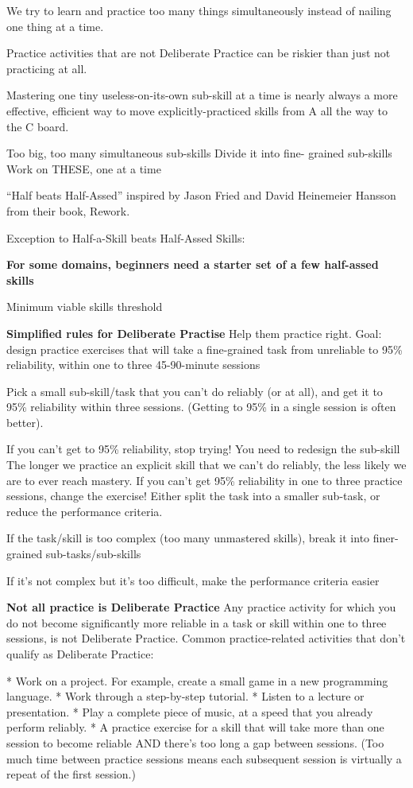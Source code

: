 We try to learn and practice too many things simultaneously instead of nailing one thing at a time.

Practice activities that are not Deliberate Practice can be riskier
than just not practicing at all.

Mastering one tiny useless-on-its-own sub-skill at a time
is nearly always a more effective, efficient way to move explicitly-practiced skills from A all the way to the C board.

Too big, too many simultaneous sub-skills
Divide it into fine- grained sub-skills
Work on THESE, one at a time

“Half beats Half-Assed” inspired by Jason Fried and David Heinemeier Hansson from their book, Rework.

Exception to Half-a-Skill beats Half-Assed Skills:

\textbf{For some domains, beginners need a starter set of a few half-assed skills}

Minimum viable skills threshold

\textbf{Simplified rules for Deliberate Practise}
Help them practice right. Goal: design practice exercises that will take a fine-grained task from unreliable to 95\% reliability, within one to three 45-90-minute sessions

Pick a small sub-skill/task that you can’t do reliably (or at all), and get it to 95\% reliability within three sessions. (Getting to 95\% in a single session is often better).

If you can’t get to 95\% reliability, stop trying! You need to redesign the sub-skill
The longer we practice an explicit skill that we can’t do reliably, the less likely we are to ever reach mastery. If you can’t get 95\% reliability in one to three practice sessions, change the exercise! Either split the task into a smaller sub-task, or reduce the performance criteria.

If the task/skill is too complex (too many unmastered skills), break it into finer-grained sub-tasks/sub-skills

If it’s not complex but it’s too difficult, make the performance criteria easier

\textbf{Not all practice is Deliberate Practice}
Any practice activity for which you do not become significantly more reliable in a task or skill within one to three sessions, is not Deliberate Practice. Common practice-related activities that don’t qualify as Deliberate Practice:

* Work on a project. For example, create a small game in a new programming language.
* Work through a step-by-step tutorial.
* Listen to a lecture or presentation.
* Play a complete piece of music, at a speed that you already perform reliably.
* A practice exercise for a skill that will take more than one session to become reliable AND there’s too long a gap between sessions. (Too much time between practice sessions means each subsequent session is virtually a repeat of the first session.)

